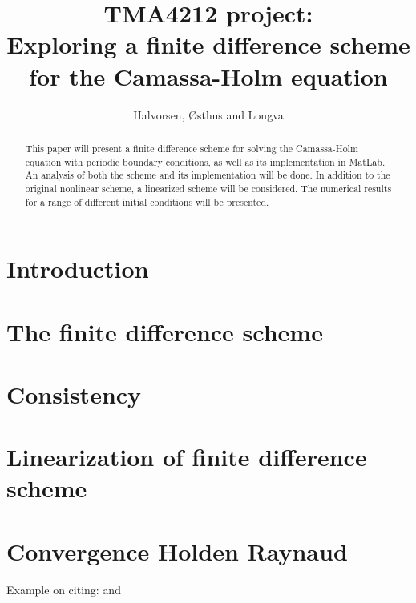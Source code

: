 \documentclass{article}
\title{TMA4212 project: \\ Exploring a finite difference scheme for the Camassa-Holm equation}
\author{Halvorsen, Østhus and Longva}
\begin{document}
\maketitle

\begin{abstract}
This paper will present a finite difference scheme for solving the Camassa-Holm equation with periodic boundary conditions, as well as its implementation in MatLab. An analysis of both the scheme and its implementation will be done. In addition to the original nonlinear scheme, a linearized scheme will be considered. The numerical results for a range of different initial conditions will be presented. 
\end{abstract}

\newpage

\section*{Introduction}


\newpage

\section*{The finite difference scheme}


\newpage

\section*{Consistency}


\newpage


\section*{Linearization of finite difference scheme}


\newpage

\section*{Convergence Holden Raynaud}


Example on citing: \cite{holden2006convergence} and \cite{dahlby2007geometric}
{}

\end{document}
